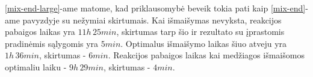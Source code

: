 \ref{mix-end-large}-ame matome, kad priklausomybė beveik tokia pati kaip \ref{mix-end}-ame pavyzdyje su nežymiai skirtumais. Kai išmaišymas nevyksta, reakcijos pabaigos laikas yra $11h\,25min$, skirtumas tarp šio ir rezultato su įprastomis pradinėmis sąlygomis yra $5min$. Optimalus išmaišymo laikas šiuo atveju yra $1h\,36min$, skirtumas - $6min$. Reakcijos pabaigos laikas kai medžiagos išmaišomos optimaliu laiku - $9h\,29min$, skirtumas - $4min$.